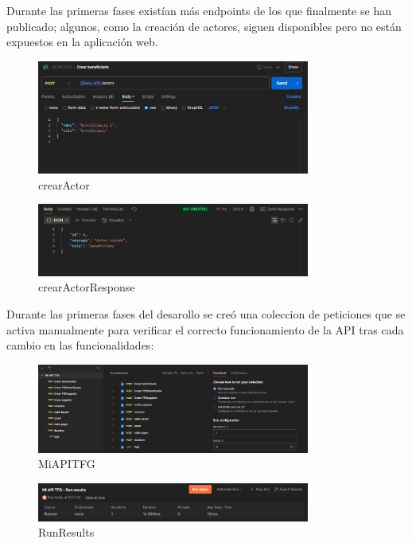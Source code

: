 Durante las primeras fases existían más endpoints de los que finalmente se han
publicado; algunos, como la creación de actores, siguen disponibles pero no
están expuestos en la aplicación web.

\begin{figure}[H]
  \centering
  \includegraphics[width=0.8\textwidth]{Imagenes/crearActor.png}
  \caption{crearActor}
  \label{fig:crearActor}
\end{figure}

\begin{figure}[H]
  \centering
  \includegraphics[width=0.8\textwidth]{Imagenes/crearActorResponse.png}
  \caption{crearActorResponse}
  \label{fig:crearActorResponse}
\end{figure}

Durante las primeras fases del desarollo se creó una coleccion de peticiones que se activa manualmente para verificar el correcto funcionamiento de la API tras cada cambio en las funcionalidades:

\begin{figure}[H]
  \centering
  \includegraphics[width=0.8\textwidth]{Imagenes/MiAPITFG.png}
  \caption{MiAPITFG}
  \label{fig:MiAPITFG}
\end{figure}

\begin{figure}[H]
  \centering
  \includegraphics[width=0.8\textwidth]{Imagenes/RunResults.png}
  \caption{RunResults}
  \label{fig:RunResults}
\end{figure}

